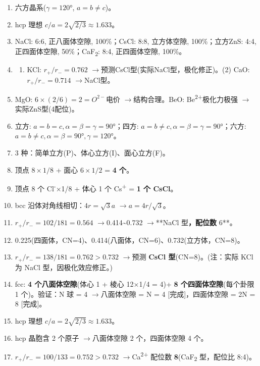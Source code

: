 \documentclass[a4paper,11pt]{ctexart}
\providecommand{\tightlist}{\setlength{\itemsep}{0pt}\setlength{\parskip}{0pt}}
\newcommand{\箭}{\ensuremath{\rightarrow}}
\newcommand{\左箭}{\ensuremath{\leftarrow}}
\newcommand{\上箭}{\ensuremath{\uparrow}}
\newcommand{\下箭}{\ensuremath{\downarrow}}
\newcommand{\衡}{\ensuremath{\rightleftharpoons}}
\newcommand{\双箭}{\ensuremath{\leftrightarrow}}
\newcommand{\约等于}{\ensuremath{\approx}}
\newcommand{\小于等于}{\ensuremath{\leq}}
\newcommand{\大于等于}{\ensuremath{\geq}}
\newcommand{\不等于}{\ensuremath{\neq}}
\newcommand{\西格马}{\ensuremath{\sigma}}
\newcommand{\派}{\ensuremath{\pi}}
\begin{document}
\begin{enumerate}
\def\labelenumi{\arabic{enumi}.}
\item
  六方晶系(\(\gamma=120°\), \(a=b\neq c\))。
\item
  hcp 理想 \(c/a = 2\sqrt{2/3} \approx 1.633\)。
\item
  NaCl: 6:6, 正八面体空隙, 100\%；CsCl: 8:8, 立方体空隙, 100\%；立方ZnS: 4:4, 正四面体空隙, 50\%；CaF\textsubscript{2}: 8:4, 正四面体空隙, 100\%。
\item
  \begin{enumerate}
  \def\labelenumii{(\arabic{enumii})}
  \tightlist
  \item
    KCl: \(r_+/r_-=0.762\) \箭 预测CsCl型(实际NaCl型，极化修正)。(2) CaO: \(r_+/r_-=0.714\) \箭 NaCl型。
  \end{enumerate}
\item
  MgO: \(6\times(2/6)=2=O^{2-}\)电价 \箭 结构合理。BeO: Be\textsuperscript{2+}极化力极强 \箭 实际ZnS型(4配位)。
\item
  立方: \(a=b=c, \alpha=\beta=\gamma=90°\)；四方: \(a=b\neq c, \alpha=\beta=\gamma=90°\)；六方: \(a=b\neq c, \alpha=\beta=90°, \gamma=120°\)。
\item
  3 种：简单立方(P)、体心立方(I)、面心立方(F)。
\item
  顶点 \(8\times1/8\) + 面心 \(6\times1/2\) = \textbf{4 个}。
\item
  顶点 8 个 Cl\textsuperscript{-}×1/8 + 体心 1 个 Cs\textsuperscript{+} = \textbf{1 个 CsCl}。
\item
  bcc 沿体对角线相切：\(4r = \sqrt{3}a\) \箭 \(a = 4r/\sqrt{3}\)。
\item
  \(r_+/r_- = 102/181 = 0.564\) \箭 0.414\textasciitilde0.732 \箭 **NaCl 型\textbf{，配位数 }6**。
\item
  0.225(四面体，CN=4)、0.414(八面体，CN=6)、0.732(立方体，CN=8)。
\item
  \(r_+/r_- = 138/181 = 0.762 > 0.732\) \箭 预测 \textbf{CsCl 型}(CN=8)。(注：实际 KCl 为 NaCl 型，因极化效应修正。)
\item
  fcc: \textbf{4 个八面体空隙}(体心 1 + 棱心 12×1/4 = 4)+ \textbf{8 个四面体空隙}(每个卦限 1 个)。验证：N 球 = 4 \箭 八面体空隙 = N = 4 {[}完成{]}，四面体空隙 = 2N = 8 {[}完成{]}。
\item
  hcp 理想 \(c/a = 2\sqrt{2/3} \approx 1.633\)。
\item
  hcp 晶胞含 2 个原子 \箭 八面体空隙 2 个，四面体空隙 4 个。
\item
  \(r_+/r_- = 100/133 = 0.752 > 0.732\) \箭 Ca\textsuperscript{2+} 配位数 \textbf{8}(CaF\textsubscript{2} 型，配位比 8:4)。

\end{enumerate}
\end{document}
